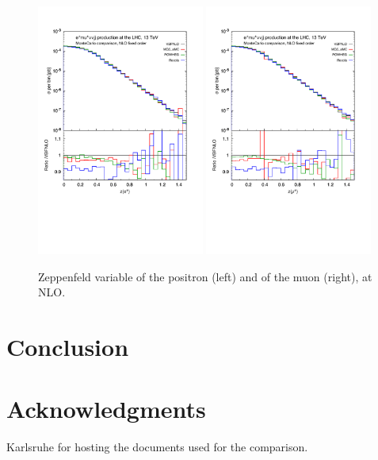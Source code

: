 \documentclass[a4paper,10pt]{report}
\begin{document}
\begin{figure}[h!]
   \centering
   \includegraphics[width=0.49\textwidth,angle=0,clip=true,trim={0.4cm 4.cm 0.6cm 1.5cm}]{figures/ze_NLO.pdf}
   \includegraphics[width=0.49\textwidth,angle=0,clip=true,trim={0.4cm 4.cm 0.6cm 1.5cm}]{figures/zmu_NLO.pdf}
\caption{\label{fig:zel-muNLO}Zeppenfeld variable of the positron (left) and of the muon (right), at NLO.
}
\end{figure}

\part{Conclusion}

\part{Acknowledgments}

Karlsruhe for hosting the documents used for the comparison.
\end{document}

